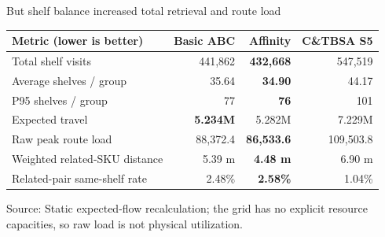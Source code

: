 \documentclass[aspectratio=169,10pt]{beamer}
\newcommand{\source}[1]{\vfill{\tiny\color{gray}Source: #1}}
\begin{document}
\begin{frame}{But shelf balance increased total retrieval and route load}
  \scriptsize
  \centering
  \begin{tabular}{@{}lrrr@{}}
    \toprule
    \textbf{Metric (lower is better)} & \textbf{Basic ABC} & \textbf{Affinity} & \textbf{C\&TBSA S5}\\
    \midrule
    Total shelf visits & 441,862 & \cellcolor{Green!15}\textbf{432,668} & \cellcolor{Red!10}547,519\\
    Average shelves / group & 35.64 & \cellcolor{Green!15}\textbf{34.90} & \cellcolor{Red!10}44.17\\
    P95 shelves / group & 77 & \cellcolor{Green!15}\textbf{76} & \cellcolor{Red!10}101\\
    Expected travel & \cellcolor{Green!15}\textbf{5.234M} & 5.282M & \cellcolor{Red!10}7.229M\\
    Raw peak route load & 88,372.4 & \cellcolor{Green!15}\textbf{86,533.6} & \cellcolor{Red!10}109,503.8\\
    Weighted related-SKU distance & 5.39 m & \cellcolor{Green!15}\textbf{4.48 m} & \cellcolor{Red!10}6.90 m\\
    Related-pair same-shelf rate & 2.48\% & \cellcolor{Green!15}\textbf{2.58\%} & \cellcolor{Red!10}1.04\%\\
    \bottomrule
  \end{tabular}
  \vspace{0.42cm}
  \source{Static expected-flow recalculation; the grid has no explicit resource capacities, so raw load is not physical utilization.}
\end{frame}
\end{document}
